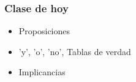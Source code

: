 \documentclass[14pt,aspectratio=169,xcolor=dvipsnames]{beamer}
\begin{document}
\begin{frame}\frametitle{Clase de hoy}
    \begin{itemize}
        \item Proposiciones
        \item 'y', 'o', 'no', Tablas de verdad
        \item Implicancias
    \end{itemize}

    \vspace{1cm}
\end{frame}
\begin{frame}
    \maketitle
\end{frame}
\end{document}
